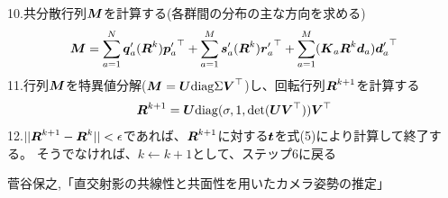 \documentclass[]{jarticle}          %
\begin{document}
10.共分散行列$\MU$を計算する(各群間の分布の主な方向を求める) \\
\begin{equation}
  \MU=\sum^N_{a=1}\qU'_a (\RU^k){\pU'_a}^\top+\sum^M_{a=1}\sU'_a (\RU^k){\rU'_a}^\top+\sum^M_{a=1}(\KU_a\RU^k\dU_a){\dU'_a}^\top
\end{equation}
11.行列$\MU$を特異値分解($\MU=\UU\diag\Sigma\VU^\top$)し、回転行列$\RU^{k+1}$を計算する
\begin{equation}
  \RU^{k+1}=\UU\diag(\sigma,1,\det(\UU\VU^\top))\VU^\top
\end{equation}
12.$||\RU^{k+1}-\RU^k||<\epsilon$であれば、$\RU^{k+1}$に対する$\tU$を式(5)により計算して終了する。
そうでなければ、$k\leftarrow{k+1}$として、ステップ6に戻る

\begin{thebibliography}{99}
 菅谷保之,「直交射影の共線性と共面性を用いたカメラ姿勢の推定」
\end{thebibliography}
\end{document}
